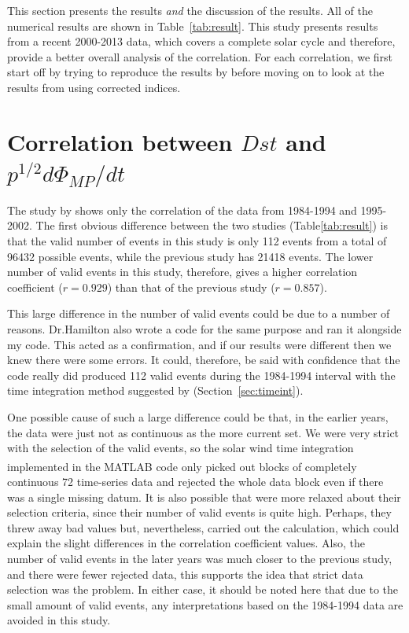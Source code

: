\documentclass[12pt]{report} %
\begin{document}
This section presents the results \emph{and} the discussion of the results. All of the numerical results are shown in  Table~\ref{tab:result}. This study presents results from a recent 2000-2013 data, which covers a complete solar cycle and therefore, provide a better overall analysis of the correlation. For each correlation, we first start off by trying to reproduce the results by \cite{newell07} before moving on to look at the results from using corrected indices. 
\vspace{0pt}
\section{Correlation between $Dst$ and ${p^{1/2}d\Phi_{MP}/dt}$}
\vspace{0pt}
The study by \cite{newell07} shows only the correlation of the data from 1984-1994 and 1995-2002. The first obvious difference between the two studies (Table\ref{tab:result}) is that the valid number of events in this study is only 112 events from a total of 96432 possible events, while the previous study has 21418 events. The lower number of valid events in this study, therefore, gives a higher  correlation coefficient ($r=0.929$) than that of the previous study ($r=0.857$). 

This large difference in the number of valid events could be due to a number of reasons. Dr.Hamilton also wrote a code for the same purpose and ran it alongside my code. This acted as a confirmation, and if our results were different then we knew there were some errors. It could, therefore, be said with confidence that the code really did produced 112 valid events during the 1984-1994 interval with the time integration method suggested by \cite{newell07} (Section~\ref{sec:timeint}). 

One possible cause of such a large difference could be that, in the earlier years, the data were just not as continuous as the more current set. We were very strict with the selection of the valid events, so the solar wind time integration implemented in the MATLAB\textsuperscript{\textregistered} code only picked out blocks of completely continuous 72 time-series data and rejected the whole data block even if there was a single missing datum. It is also possible that \cite{newell07} were more relaxed about their selection criteria, since their number of valid events is quite high. Perhaps, they threw away bad values but, nevertheless, carried out the calculation, which could explain the slight differences in the correlation coefficient values. Also, the number of valid events in the later years was much closer to the previous study, and there were fewer rejected data, this supports the idea that strict data selection was the problem. In either case, it should be noted here that due to the small amount of valid events, any interpretations based on the 1984-1994 data are avoided in this study.
\end{document}
